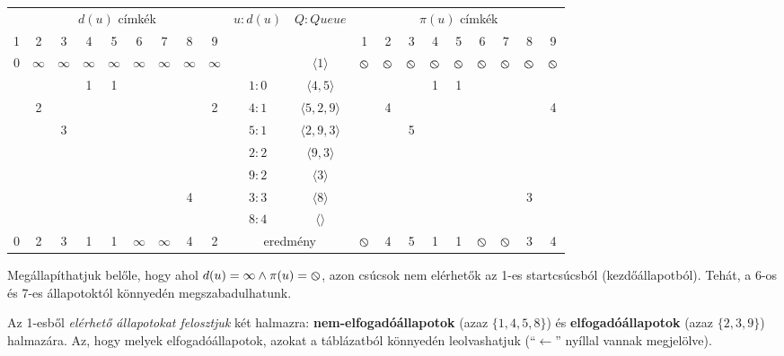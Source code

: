 \documentclass[a4paper,11pt]{article}
\begin{document}
\begin{center}
	\begin{tiny}
		\setlength{\tabcolsep}{0.5em} %
		{\renewcommand{\arraystretch}{1.5}%
			\begin{tabular}{|c|c|c|c|c|c|c|c|c|c|c|c|c|c|c|c|c|c|c|c|}
				\hline
				\multicolumn{9}{|c|}{$d(u)$ címkék} & \multirow{3}{*}{$u:d(u)$} & \multirow{2}{*}{$Q : Queue$}  &  \multicolumn{9}{|c|}{$\pi(u)$ címkék}  \\
				\cline{1-9} \cline{12-20}
				1 & 2 & 3 & 4 & 5 & 6 & 7 & 8 & 9 & &  & 1 & 2 & 3 & 4 & 5 & 6 & 7 & 8 & 9 \\
				\cline{1-9} \cline{11-20}
				0 & $\infty$ & $\infty$ & $\infty$ & $\infty$ & $\infty$ & $\infty$ & $\infty$ & $\infty$ & & $\langle 1 \rangle$ & $\varobslash$ & $\varobslash$ & $\varobslash$ & $\varobslash$ & $\varobslash$ & $\varobslash$ & $\varobslash$ & $\varobslash$ & $\varobslash$ \\
				\hline
				&  &  & 1 & 1 &  &  &  &  & $1:0$ & $\langle4,5\rangle$ &  &  &  & 1 & 1 &  &  &  &  \\
				\hline
				& 2 &  &  &  &  &  &  & 2 & $4:1$ & $\langle5,2,9\rangle$ &  & 4 &  &  &  &  &  &  & 4 \\
				\hline
				&  & 3 &  &  &  &  &  &  & $5:1$ & $\langle2,9,3\rangle$ &  &  & 5 &  &  &  &  &  &  \\
				\hline
				&  &  &  &  &  &  &  &  & $2:2$ & $\langle9,3\rangle$ &  &  &  &  &  &  &  &  &  \\
				\hline
				&  &  &  &  &  &  &  &  & $9:2$ & $\langle3\rangle$ &  &  &  &  &  &  &  &  &  \\
				\hline
				&  &  &  &  &  &  & 4 &  & $3:3$ & $\langle8\rangle$ &  &  &  &  &  &  &  & 3 &  \\
				\hline
				&  &  &  &  &  &  &  &  & $8:4$ & $\langle\rangle$ &  &  &  &  &  &  &  &  &  \\
				\hline
				0 & 2 & 3 & 1 & 1 & $\infty$ & $\infty$ & 4 & 2 & \multicolumn{2}{|c|}{eredmény} & $\varobslash$ & 4 & 5 & 1 & 1 & $\varobslash$ & $\varobslash$ & 3 & 4 \\
				\hline
			\end{tabular}
		}
	\end{tiny}
\end{center}

Megállapíthatjuk belőle, hogy ahol $d(u) = \infty \land \pi(u) = \varobslash$, azon csúcsok nem elérhetők az 1-es startcsúcsból (kezdőállapotból). Tehát, a 6-os és 7-es állapotoktól könnyedén megszabadulhatunk.

Az 1-esből \textit{elérhető állapotokat felosztjuk} két halmazra: \textbf{nem-elfogadóállapotok} (azaz $\{1,4,5,8\}$) és \textbf{elfogadóállapotok} (azaz $\{2,3,9\}$) halmazára. Az, hogy melyek elfogadóállapotok, azokat a táblázatból könnyedén leolvashatjuk (``$\leftarrow$'' nyíllal vannak megjelölve).
\end{document}
